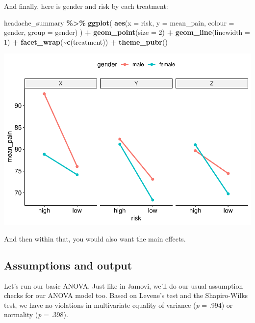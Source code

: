 \documentclass[
]{book}
\newenvironment{Shaded}{\begin{snugshade}}{\end{snugshade}}
\newcommand{\AttributeTok}[1]{\textcolor[rgb]{0.13,0.29,0.53}{#1}}
\newcommand{\DecValTok}[1]{\textcolor[rgb]{0.00,0.00,0.81}{#1}}
\newcommand{\FunctionTok}[1]{\textcolor[rgb]{0.13,0.29,0.53}{\textbf{#1}}}
\newcommand{\NormalTok}[1]{#1}
\newcommand{\SpecialCharTok}[1]{\textcolor[rgb]{0.81,0.36,0.00}{\textbf{#1}}}
\begin{document}
And finally, here is gender and risk by each treatment:

\begin{Shaded}
\begin{Highlighting}[]
\NormalTok{headache\_summary }\SpecialCharTok{\%\textgreater{}\%}
  \FunctionTok{ggplot}\NormalTok{(}
    \FunctionTok{aes}\NormalTok{(}\AttributeTok{x =}\NormalTok{ risk, }\AttributeTok{y =}\NormalTok{ mean\_pain, }\AttributeTok{colour =}\NormalTok{ gender, }\AttributeTok{group =}\NormalTok{ gender)}
\NormalTok{  ) }\SpecialCharTok{+}
  \FunctionTok{geom\_point}\NormalTok{(}\AttributeTok{size =} \DecValTok{2}\NormalTok{) }\SpecialCharTok{+}
  \FunctionTok{geom\_line}\NormalTok{(}\AttributeTok{linewidth =} \DecValTok{1}\NormalTok{) }\SpecialCharTok{+}
  \FunctionTok{facet\_wrap}\NormalTok{(}\SpecialCharTok{\textasciitilde{}}\FunctionTok{c}\NormalTok{(treatment)) }\SpecialCharTok{+}
  \FunctionTok{theme\_pubr}\NormalTok{()}
\end{Highlighting}
\end{Shaded}

\includegraphics{_main_files/figure-latex/unnamed-chunk-252-1.pdf}

And then within that, you would also want the main effects.

\hypertarget{assumptions-and-output}{%
\subsection{Assumptions and output}\label{assumptions-and-output}}

Let's run our basic ANOVA. Just like in Jamovi, we'll do our usual assumption checks for our ANOVA model too. Based on Levene's test and the Shapiro-Wilks test, we have no violations in multivariate equality of variance (\emph{p} = .994) or normality (\emph{p} = .398).
\end{document}
